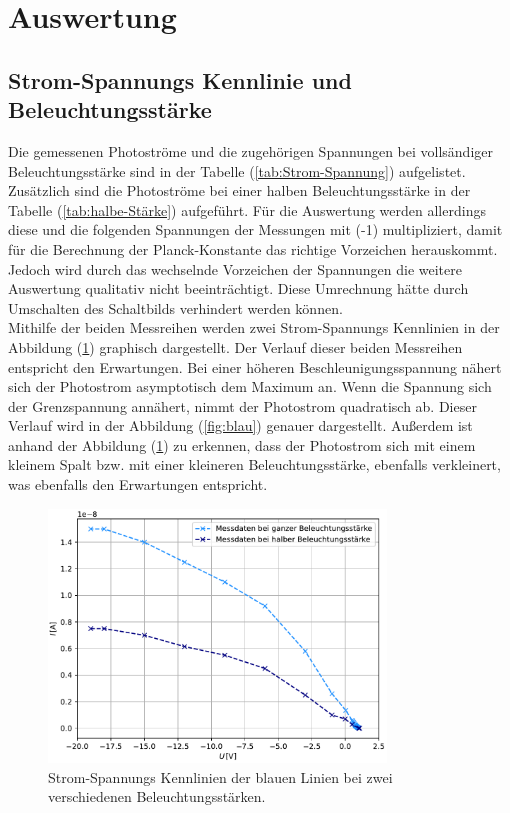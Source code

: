 \nocite{anleitungV500}
\section{Auswertung}
\label{sec:Auswertung}

\subsection{Strom-Spannungs Kennlinie und Beleuchtungsstärke}
Die gemessenen Photoströme und die zugehörigen Spannungen bei vollsändiger Beleuchtungsstärke sind in der Tabelle (\ref{tab:Strom-Spannung}) aufgelistet. 
Zusätzlich sind die Photoströme bei einer halben Beleuchtungsstärke in der Tabelle (\ref{tab:halbe-Stärke}) aufgeführt.
Für die Auswertung werden allerdings diese und die folgenden Spannungen der Messungen mit (-1) multipliziert, damit für die Berechnung der Planck-Konstante 
das richtige Vorzeichen herauskommt. Jedoch wird durch das wechselnde Vorzeichen der Spannungen die weitere Auswertung qualitativ nicht beeinträchtigt. Diese
Umrechnung hätte durch Umschalten des Schaltbilds verhindert werden können. \\
Mithilfe der beiden Messreihen werden zwei Strom-Spannungs Kennlinien in der Abbildung (\ref{fig:Plot1}) graphisch dargestellt. Der Verlauf dieser beiden
Messreihen entspricht den Erwartungen. Bei einer höheren Beschleunigungsspannung nähert sich der Photostrom asymptotisch dem Maximum an. Wenn die Spannung sich
der Grenzspannung annähert, nimmt der Photostrom quadratisch ab. Dieser Verlauf wird in der Abbildung (\ref{fig:blau}) genauer dargestellt. Außerdem ist anhand der Abbildung (\ref{fig:Plot1})
zu erkennen, dass der Photostrom sich mit einem kleinem Spalt bzw. mit einer kleineren Beleuchtungsstärke, ebenfalls verkleinert, was ebenfalls den Erwartungen entspricht. 
\begin{figure}[H]
    \centering
    \includegraphics[width=0.8\textwidth]{Plots/Plot1.pdf}
    \caption{Strom-Spannungs Kennlinien der blauen Linien bei zwei verschiedenen Beleuchtungsstärken.}
    \label{fig:Plot1}
\end{figure}
